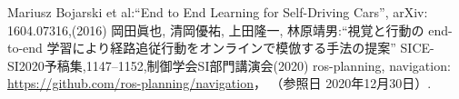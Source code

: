 \documentclass[10pt]{jarticle}
\begin{document}
    \vspace{5truemm}
    {\footnotesize
        \begin{thebibliography}{99}
            
            
            Mariusz Bojarski et al:``End to End Learning for Self-Driving Cars'',
            arXiv: 1604.07316,(2016)
            岡田眞也, 清岡優祐, 上田隆一, 林原靖男:``視覚と行動の end-to-end 
            学習により経路追従行動をオンラインで模倣する手法の提案''
            SICE-SI2020予稿集,1147--1152,制御学会SI部門講演会(2020)
            ros-planning, navigation: 
            \url{https://github.com/ros-planning/navigation}， 
            （参照日 2020年12月30日）. 
            
            
        \end{thebibliography}
    }
    \normalsize
    
\end{document}

